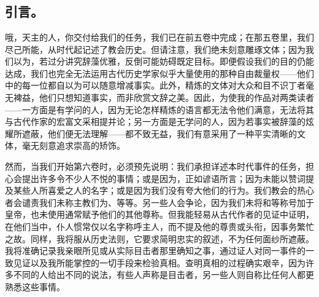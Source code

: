 

\section{}


\subsection{引言。}

哦，天主的人，你交付给我们的任务，我们已在前五卷中完成；在那五卷里，我们尽己所能，从时代起记述了教会历史。但请注意，我们绝未刻意雕琢文体；因为我们以为，若过分讲究辞藻优雅，反倒可能妨碍既定目标。即便假设我们的目的仍能达成，我们也完全无法运用古代历史学家似乎大量使用的那种自由裁量权——他们中的每一位都自以为可以随意增减事实。此外，精炼的文体对大众和目不识丁者毫无裨益，他们只想知道事实，而非欣赏文辞之美。因此，为使我的作品对两类读者——一方面是有学问的人，因为无论怎样精炼的语言都无法令他们满意，无法将其与古代作家的宏富文采相提并论；另一方面是无学问的人，因为若事实被辞藻的炫耀所遮蔽，他们便无法理解——都不致无益，我们有意采用了一种平实清晰的文体，毫无刻意追求崇高的矫饰。\par

然而，当我们开始第六卷时，必须预先说明：我们承担详述本时代事件的任务，担心会提出许多令不少人不悦的事情；或是因为，正如谚语所言；因为未能以赞词提及某些人所喜爱之人的名字；或是因为我们没有夸大他们的行为。我们教会的热心者会谴责我们未称主教们为、等等。另一些人会争论，因为我们未将和等称号加于皇帝，也未使用通常赋予他们的其他尊称。但我能轻易从古代作者的见证中证明，在他们当中，仆人惯常仅以名字称呼主人，而不提及他的尊贵或头衔，因事务繁忙之故。同样，我将服从历史法则，它要求简明忠实的叙述，不为任何面纱所遮蔽。我将准确记录我亲眼所见或从实际目击者那里确知之事，通过证人对同一事件的一致见证以及我所能掌控的一切手段来检验真相。查明真相的过程确实艰辛，因为许多不同的人给出不同的说法，有些人声称是目击者，另一些人则自称比任何人都更熟悉这些事情。\par

